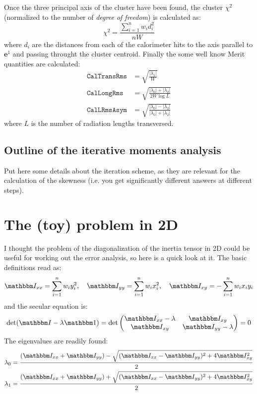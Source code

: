 \documentclass[a4paper,11pt]{article}
\newcommand{\itm}{\mathbbm I}
\newcommand{\itc}[1]{\itm_{#1}}
\begin{document}
Once the three principal axis of the cluster have been found, the
cluster $\chi^2$ (normalized to the number of \emph{degree of freedom}) is
calculated as:
\begin{equation}
  \chi^2 = \frac{\sum_{i=1}^n w_i d_i^2}{nW}
\end{equation}
where $d_i$ are the distances from each of the calorimeter hits to the
axis parallel to $\mathbf{e}^1$ and passing throught the cluster
centroid. Finally the some well know Merit quantities are calculated:
\begin{align}
  \texttt{CalTransRms} &= \sqrt{\frac{|\lambda_1|}{W}}\\
  \texttt{CalLongRms}  &= \sqrt{\frac{|\lambda_0| + |\lambda_2|}{2W\log L}}\\
  \texttt{CalLRmsAsym} &= \sqrt{\frac{|\lambda_0| - |\lambda_2|}
    {|\lambda_0| + |\lambda_2|}}
\end{align}
where $L$ is the number of radiation lengths transversed.

\subsection{Outline of the iterative moments analysis}

Put here some details about the iteration scheme, as they are
relevant for the calculation of the skewness (i.e. you get significantly
different answers at different steps).



\section{The (toy) problem in 2D}

I thought the problem of the diagonalization of the inertia tensor in 2D
could be useful for working out the error analysis, so here is a quick look at
it. The basic definitions read as:
\begin{align}
  \itc{xx}  = \sum_{i=1}^n w_i y_i^2,\quad
  \itc{yy}  = \sum_{i=1}^n w_i x_i^2,\quad
  \itc{xy}  = -\sum_{i=1}^n w_ix_iy_i
\end{align}
and the secular equation is:
\begin{equation}
  \det(\itm - \lambda{\mathbbm 1}) =
  \det\begin{pmatrix}
  \itc{xx} - \lambda & \itc{xy}\\
  \itc{xy} & \itc{yy} - \lambda
  \end{pmatrix} = 0
\end{equation}
The eigenvalues are readily found:
\begin{align}
  \lambda_0 &= \frac{(\itc{xx} + \itc{yy}) -
    \sqrt{(\itc{xx} - \itc{yy})^2 + 4\itc{xy}^2}}{2}\\
  \lambda_1 &= \frac{(\itc{xx} + \itc{yy}) +
    \sqrt{(\itc{xx} - \itc{yy})^2 + 4\itc{xy}^2}}{2}\\
\end{align}
\end{document}
